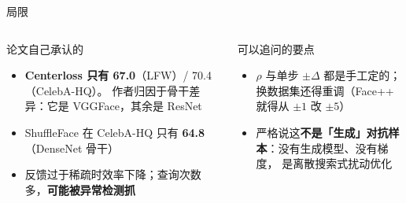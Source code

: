 \begin{frame}{局限}
  \vspace{-3.6em}
  \begin{columns}[T]
    \begin{block}{论文自己承认的}
      \small
      \begin{itemize}
        \item \textbf{Centerloss 只有 67.0}（LFW）/ 70.4（CelebA-HQ）。
              作者归因于骨干差异：它是 VGGFace，其余是 ResNet
        \item ShuffleFace 在 CelebA-HQ 只有 \textbf{64.8}（DenseNet 骨干）
        \item 反馈过于稀疏时效率下降；查询次数多，\textbf{可能被异常检测抓}
      \end{itemize}
    \end{block}

    \begin{alertblock}{可以追问的要点}
      \small
      \begin{itemize}
        \item $\rho$ 与单步 $\pm\Delta$ 都是手工定的；
              换数据集还得重调（Face++ 就得从 $\pm1$ 改 $\pm5$）
        \item 严格说这\textbf{不是「生成」对抗样本}：没有生成模型、没有梯度，
              是离散搜索式扰动优化
      \end{itemize}
    \end{alertblock}
  \end{columns}
\end{frame}
